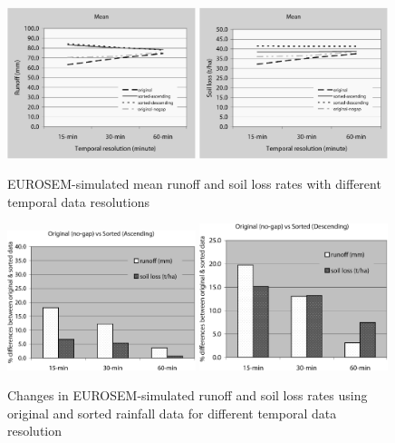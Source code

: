\begin{figure}[htbp]
  \centering
    \includegraphics[width=0.49\textwidth]{./img/eurosem_mean_runoff}
    \includegraphics[width=0.49\textwidth]{./img/eurosem_mean_soilloss}
  \caption{EUROSEM-simulated mean runoff and soil loss rates with different
temporal data resolutions}
  \label{fig:eurosem_mean_runoff_soilloss_diff}
\end{figure}

\begin{figure}[htbp]
  \centering
    \includegraphics[width=0.49\textwidth]
{./img/eurosem_diff_runoff_soilloss_asc}
    \includegraphics[width=0.49\textwidth]
{./img/eurosem_diff_runoff_soilloss_des}
  \caption{Changes in EUROSEM-simulated runoff and soil loss rates using
original and sorted rainfall data for different temporal data resolution}
  \label{fig:eurosem_diff_runoff_soilloss}
\end{figure}

